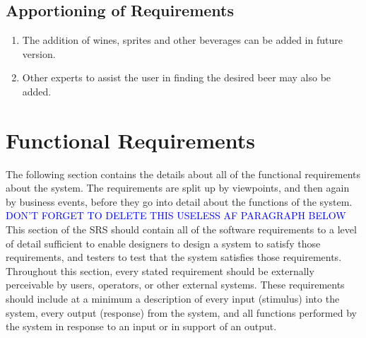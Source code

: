 \documentclass[]{article}
\begin{document}
\subsection{Apportioning of Requirements}
\label{sub:apportioning_of_requirements}
\begin{enumerate}
	\item The addition of wines, sprites and other beverages can be added in future version.
	\item Other experts to assist the user in finding the desired beer may also be added.
\end{enumerate}


\section{Functional Requirements}
\label{sec:functional_requirements}
The following section contains the details about all of the functional requirements about the system. The requirements are split up by viewpoints, and then again by business events, before they go into detail about the functions of the system.\\ 

\textcolor{blue}{DON'T FORGET TO DELETE THIS USELESS AF PARAGRAPH BELOW}\\

This section of the SRS should contain all of the software requirements to a level of detail sufficient to enable designers to design a system to satisfy those requirements, and testers to test that the system satisfies those requirements. Throughout this section, every stated requirement should be externally perceivable by users, operators, or other external systems. These requirements should include at a minimum a description of every input (stimulus) into the system, every output (response) from the system, and all functions performed by the system in response to an input or in support of an output.
\end{document}
